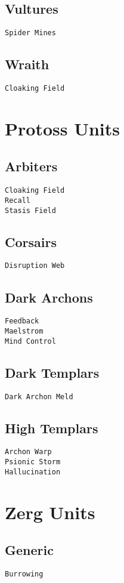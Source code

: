 \subsection{Vultures}
\verb|Spider Mines|

\subsection{Wraith}
\verb|Cloaking Field| 

\section{Protoss Units}

\subsection{Arbiters}
\verb|Cloaking Field| \\
\verb|Recall| \\
\verb|Stasis Field|

\subsection{Corsairs}
\verb|Disruption Web|

\subsection{Dark Archons}
\verb|Feedback| \\
\verb|Maelstrom| \\
\verb|Mind Control|

\subsection{Dark Templars}
\verb|Dark Archon Meld|

\subsection{High Templars}
\verb|Archon Warp| \\
\verb|Psionic Storm| \\
\verb|Hallucination|

\section{Zerg Units}

\subsection{Generic}
\verb|Burrowing| \\

